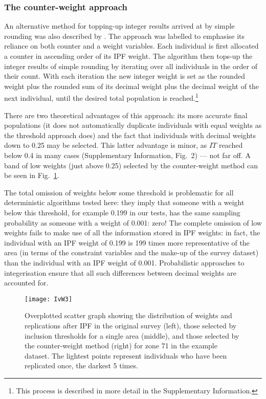 \subsubsection{The counter-weight approach}
An alternative method for topping-up integer results arrived at by simple
rounding was also described by \citet{Ballas2005c}. The approach was labelled
to emphasise its reliance on both counter and a weight variables. Each
individual is first allocated a counter in ascending order of its IPF weight.
The algorithm then tops-up the integer results of simple rounding by iterating
over all individuals in the order of their count. With each iteration the new
integer weight is set as the rounded weight plus the rounded sum of its decimal
weight plus the decimal weight of the next individual, until the desired total
population is reached.\footnote{This process is described in more detail in the
Supplementary Information.} %

There are two theoretical advantages of this approach: its more accurate
final populations (it does not automatically duplicate individuals with equal
weights as the threshold approach does) and the fact that
individuals with decimal weights down to 0.25 may be selected.
This latter advantage is minor, as $IT$ reached below 0.4 in many cases
(Supplementary Information, Fig.~2) --- not far off.
A band of low weights (just above 0.25)
selected by the counter-weight method can be seen in
Fig.~\ref{fig:threshweights}.

The total omission of weights below some threshold is problematic for all
deterministic algorithms tested here: they imply that someone with a weight
below this threshold, for example 0.199 in our tests, has the same sampling
probability as someone with a weight of 0.001: zero! The complete
omission of low weights fails to make use of all the information stored in
IPF weights: in fact, the individual with an
IPF weight of 0.199 is 199 times more representative of the area (in terms of
the constraint variables and the make-up of the survey dataset) than the
individual with an IPF weight of 0.001. Probabilistic approaches to
integerisation ensure that all such differences between decimal weights
are accounted for.

\begin{figure}[t]
 \centerline{ \texttt{[image: IvW3]}}
 \caption[Overplotted scatter graph showing the distribution of IPF
weights]{Overplotted scatter graph showing the distribution of weights and
replications after IPF in the original survey (left), those selected
by inclusion thresholds for a single area (middle), and those selected
by the counter-weight method (right) for zone 71 in the
example dataset. The lightest points represent individuals who have been
replicated once, the darkest 5 times.}
 \label{fig:threshweights}
\end{figure}

